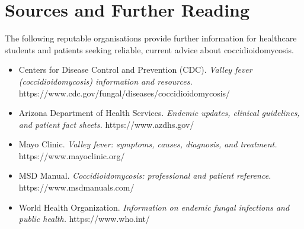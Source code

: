 \section*{Sources and Further Reading}
The following reputable organisations provide further information for healthcare students and patients seeking reliable, current advice about coccidioidomycosis.

\begin{itemize}
    \item Centers for Disease Control and Prevention (CDC). \textit{Valley fever (coccidioidomycosis) information and resources.} https://www.cdc.gov/fungal/diseases/coccidioidomycosis/
    \item Arizona Department of Health Services. \textit{Endemic updates, clinical guidelines, and patient fact sheets.} https://www.azdhs.gov/
    \item Mayo Clinic. \textit{Valley fever: symptoms, causes, diagnosis, and treatment.} https://www.mayoclinic.org/
    \item MSD Manual. \textit{Coccidioidomycosis: professional and patient reference.} https://www.msdmanuals.com/
    \item World Health Organization. \textit{Information on endemic fungal infections and public health.} https://www.who.int/
\end{itemize}
